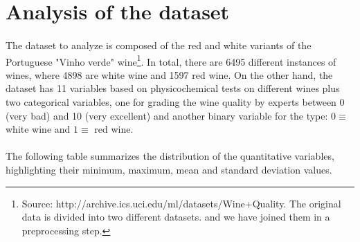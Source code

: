 \documentclass[10pt]{article}
\begin{document}




\tableofcontents

\newpage
{}

\section{Analysis of the dataset}

\paragraph*{}
The dataset to analyze is composed of the red and white variants of the Portuguese "Vinho verde" wine\footnote{Source: http://archive.ics.uci.edu/ml/datasets/Wine+Quality. The original data is divided into two different datasets. and we have joined them in a preprocessing step.}. In total, there are 6495 different instances of wines, where 4898 are white wine and 1597 red wine. On the other hand, the dataset has 11 variables based on physicochemical tests on different wines plus two categorical variables, one for grading the wine quality by experts between 0 (very bad) and 10 (very excellent) and another binary variable for the type: $0 \equiv$ white wine and $1 \equiv$ red wine.

\paragraph*{}
The following table summarizes the distribution of the quantitative variables, highlighting their minimum, maximum, mean and standard deviation values. 
\end{document}
